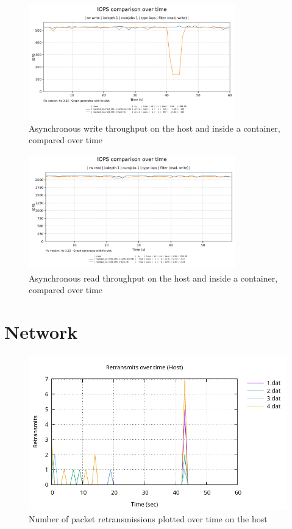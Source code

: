 \begin{figure}[H]
    \centering
    \includegraphics[width=0.8\textwidth]{images/results/sandisk-libaio-iops-write-comparison.png}
    \caption{Asynchronous write throughput on the host and inside a container, compared over time}
    \label{images:fundamentals/net-ns-veth-arch.jpg}
\end{figure}

\begin{figure}[H]
    \centering
    \includegraphics[width=0.8\textwidth]{images/results/sandisk-libaio-iops-read-comparison.png}
    \caption{Asynchronous read throughput on the host and inside a container, compared over time}
    \label{images:fundamentals/net-ns-veth-arch.jpg}
\end{figure}

\section{Network}
\label{ch:experiment/network}

\begin{figure}[H]
    \centering
    \includegraphics[width=1\textwidth]{images/results/network-host-retransmits.pdf}
    \caption{Number of packet retransmissions plotted over time on the host}
    \label{ticket-builder-class}
\end{figure}


